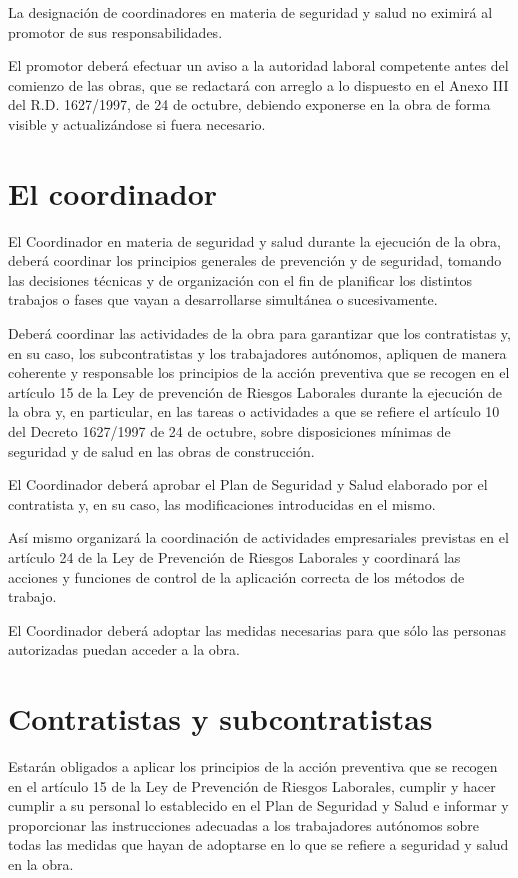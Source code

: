 La designación de coordinadores en materia de seguridad y salud no eximirá al promotor de sus responsabilidades.

El promotor deberá efectuar un aviso a la autoridad laboral competente antes del comienzo de las obras, que se redactará con arreglo a lo dispuesto en el Anexo III del R.D. 1627/1997, de 24 de octubre, debiendo exponerse en la obra de forma visible y actualizándose si fuera necesario.
\section{El coordinador}
\label{sec:sys-coordinador}
El Coordinador en materia de seguridad y salud durante la ejecución de la obra, deberá coordinar los principios generales de prevención y de seguridad, tomando las decisiones técnicas y de organización con el fin de planificar los distintos trabajos o fases que vayan a desarrollarse simultánea o sucesivamente.
	
Deberá coordinar las actividades de la obra para garantizar que los contratistas y, en su caso, los subcontratistas y los trabajadores autónomos, apliquen de manera coherente y responsable los principios de la acción preventiva que se recogen en el artículo 15 de la Ley de prevención de Riesgos Laborales durante la ejecución de la obra y, en particular, en las tareas o actividades a que se refiere el artículo 10 del Decreto 1627/1997 de 24 de octubre, sobre disposiciones mínimas de seguridad y de salud en las obras de construcción.
	
El Coordinador deberá aprobar el Plan de Seguridad y Salud elaborado por el contratista y, en su caso, las modificaciones introducidas en el mismo.

Así mismo organizará la coordinación de actividades empresariales previstas en el artículo 24 de la Ley de Prevención de Riesgos Laborales y coordinará las acciones y funciones de control de la aplicación correcta de los métodos de trabajo.

El Coordinador deberá adoptar las medidas necesarias para que sólo las personas autorizadas puedan acceder a la obra.
\section{Contratistas y subcontratistas}
\label{sec:sys-contratistas}
Estarán obligados a aplicar los principios de la acción preventiva que se recogen en el artículo 15 de la Ley de Prevención de Riesgos Laborales, cumplir y hacer cumplir a su personal lo establecido en el Plan de Seguridad y Salud e informar y proporcionar las instrucciones adecuadas a los trabajadores autónomos sobre todas las medidas que hayan de adoptarse en lo que se refiere a seguridad y salud en la obra.

